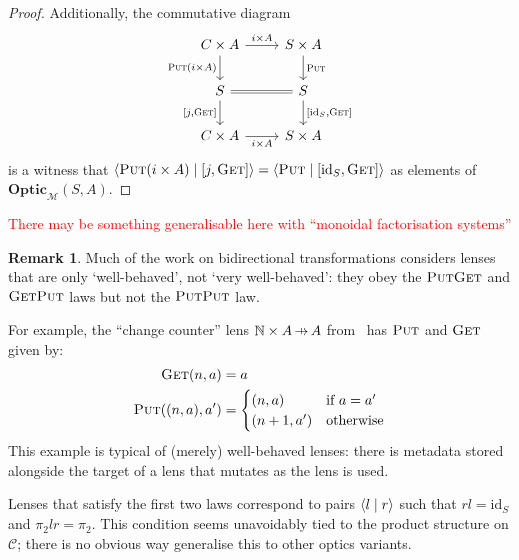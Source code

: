 \documentclass[11pt,a4paper]{article}
\theoremstyle{plain}
\theoremstyle{definition}
\newtheorem{remark}[theorem]{Remark}
\newcommand{\C}{\mathscr{C}}
\newcommand{\M}{\mathscr{M}}
\newcommand{\bN}{\mathbb{N}}
\newcommand{\Optic}{\mathbf{Optic}}
\newcommand{\id}{\mathrm{id}}
\newcommand{\rep}[2]{{\ensuremath \left\langle #1 \mid #2 \right\rangle}}
\newcommand{\fget}{\textsc{Get}}
\newcommand{\fput}{\textsc{Put}}
\newcommand{\hto}{\ensuremath{\,\mathaccent\shortmid\rightarrow\,}}
\newcommand{\todo}[1]{\textcolor{red}{\small #1}}
\begin{document}
\begin{proof}
  Additionally, the commutative diagram
  \[
    \begin{tikzcd}
      C \times A \ar[r, "i \times A"] \ar[d, "\fput (i \times A)", swap] & S \times A \ar[d, "\fput"] \\
      S \ar[r, equal] \ar[d, "{[j,\fget]}", swap] & S \ar[d, "{[\id_S, \fget]}"]  \\
      C \times A \ar[r, "i \times A", swap] & S \times A
    \end{tikzcd}
  \]
  is a witness that $\rep{\fput (i \times A)}{[j,\fget] } = \rep{\fput}{[\id_S, \fget] }$ as elements of $\Optic_\M(S, A)$.
\end{proof}

\todo{There may be something generalisable here with ``monoidal factorisation systems''}

\begin{remark}
Much of the work on bidirectional transformations \cite{CombinatorsForBidirectionalTreeTransformations} considers lenses that are only `well-behaved', not `very well-behaved': they obey the $\fput\fget$ and $\fget\fput$ laws but not the $\fput\fput$ law.

For example, the ``change counter'' lens $\bN \times A \hto A$ from~\cite{AClearPictureOfLensLaws} has $\fput$ and $\fget$ given by:
  \begin{align*}
    \fget(n, a) &= a \\
    \fput((n, a), a') &= \begin{cases}
      (n, a) & \text{if } a = a' \\
      (n+1, a') & \text{otherwise}
    \end{cases}
  \end{align*}
  This example is typical of (merely) well-behaved lenses: there is metadata stored alongside the target of a lens that mutates as the lens is used.
  
Lenses that satisfy the first two laws correspond to pairs $\rep{l}{r}$ such that $rl = \id_S$ and $\pi_2lr = \pi_2$. This condition seems unavoidably tied to the product structure on $\C$; there is no obvious way generalise this to other optics variants.
\end{remark}
\end{document}
